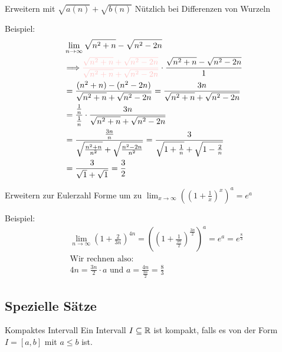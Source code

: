 \begin{KR}{Erweitern mit $\sqrt{a(n)}+\sqrt{b(n)}$}
    Nützlich bei Differenzen von Wurzeln
\end{KR}

\begin{example}
    Beispiel:
    $$
    \begin{aligned}
        &\lim_{n \rightarrow \infty} \sqrt{n^2+n}-\sqrt{n^2-2 n}\\
        &\Longrightarrow \textcolor{pink}{\frac{\sqrt{n^2+n}+\sqrt{n^2-2 n}}{\sqrt{n^2+n}+\sqrt{n^2-2 n}}} \cdot \frac{\sqrt{n^2+n}-\sqrt{n^2-2 n}}{1} \\
        &= \frac{(n^2+n)-(n^2-2 n)}{\sqrt{n^2+n}+\sqrt{n^2-2 n}}
        = \frac{3 n}{\sqrt{n^2+n}+\sqrt{n^2-2 n}}\\
        &= \frac{\frac{1}{n}}{\frac{1}{n}} \cdot \frac{3 n}{\sqrt{n^2+n}+\sqrt{n^2-2 n}} \\
        &= \frac{\frac{3 n}{n}}{\sqrt{\frac{n^2+n}{n^2}}+\sqrt{\frac{n^2-2 n}{n^2}}}
        = \frac{3}{\sqrt{1+\frac{1}{n}}+\sqrt{1-\frac{2}{n}}} \\
        &= \frac{3}{\sqrt{1}+\sqrt{1}} = \frac{3}{2}
    \end{aligned}
    $$
\end{example}

\begin{KR}{Erweitern zur Eulerzahl}
    Forme um zu $\lim_{x \rightarrow \infty}\left(\left(1+\frac{1}{x}\right)^{x}\right)^{a}=e^{a}$
\end{KR}

\begin{example}
    Beispiel:
    $$
    \begin{aligned}
        &\lim_{n \rightarrow \infty}\left(1+\frac{2}{3 n}\right)^{4 n}
        = \left(\left(1+\frac{1}{\frac{3 n}{2}}\right)^{\frac{3 n}{2}}\right)^{a}=e^{a}=e^{\frac{8}{3}}\\
        &\text{Wir rechnen also:}\\
        &4 n=\frac{3 n}{2} \cdot a \text{ und } a=\frac{4 n}{\frac{3 n}{2}}=\frac{8}{3}
    \end{aligned}
    $$
\end{example}

\subsection{Spezielle Sätze}

\begin{definition}{Kompaktes Intervall}
    Ein Intervall $I \subseteq \mathbb{R}$ ist kompakt, falls es von der Form $I=[a,b]$ mit $a \leq b$ ist.
\end{definition}

